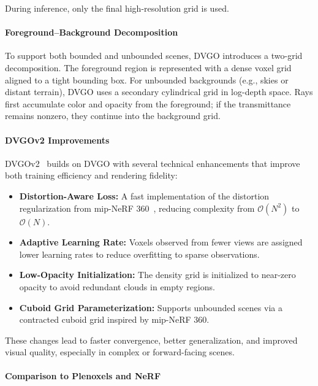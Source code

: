 \begin{enrichment}
\begin{enrichment}
    During inference, only the final high-resolution grid is used.
    
    \paragraph{Foreground–Background Decomposition}
    
    To support both bounded and unbounded scenes, DVGO introduces a two-grid decomposition. The foreground region is represented with a dense voxel grid aligned to a tight bounding box. For unbounded backgrounds (e.g., skies or distant terrain), DVGO uses a secondary cylindrical grid in log-depth space. Rays first accumulate color and opacity from the foreground; if the transmittance remains nonzero, they continue into the background grid.
    
    \paragraph{DVGOv2 Improvements}
    \label{par:chapter23_dvgo_v2}
    
    DVGOv2~\cite{sun2022_directvoxelgrid} builds on DVGO with several technical enhancements that improve both training efficiency and rendering fidelity:
    \begin{itemize}
        \item \textbf{Distortion-Aware Loss:} A fast implementation of the distortion regularization from mip-NeRF 360~\cite{barron2022_mipnerf360}, reducing complexity from \( \mathcal{O}(N^2) \) to \( \mathcal{O}(N) \).
        \item \textbf{Adaptive Learning Rate:} Voxels observed from fewer views are assigned lower learning rates to reduce overfitting to sparse observations.
        \item \textbf{Low-Opacity Initialization:} The density grid is initialized to near-zero opacity to avoid redundant clouds in empty regions.
        \item \textbf{Cuboid Grid Parameterization:} Supports unbounded scenes via a contracted cuboid grid inspired by mip-NeRF 360.
    \end{itemize}
    
    These changes lead to faster convergence, better generalization, and improved visual quality, especially in complex or forward-facing scenes.
    
    \paragraph{Comparison to Plenoxels and NeRF}
    

\end{enrichment}
\end{enrichment}
